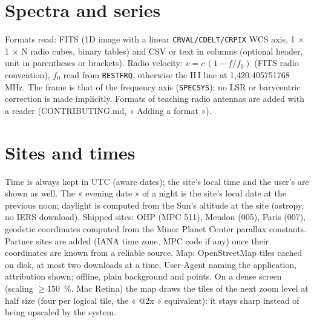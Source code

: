 \section{Spectra and series}
Formats read: FITS (1D image with a linear \texttt{CRVAL/CDELT/CRPIX} WCS axis, 1 × 1 × N radio cubes, binary
tables) and CSV or text in columns (optional header, unit in parentheses or brackets). Radio velocity:
$v = c\,(1 - f/f_0)$ (FITS radio convention), $f_0$ read from \texttt{RESTFRQ}, otherwise the H\,I line at
1,420.405751768 MHz. The frame is that of the frequency axis (\texttt{SPECSYS}); no LSR or barycentric correction is
made implicitly. Formats of teaching radio antennas are added with a reader (CONTRIBUTING.md, « Adding a format »).

\section{Sites and times}
Time is always kept in UTC (aware dates); the site's local time and the user's are shown as well. The « evening
date » of a night is the site's local date at the previous noon; daylight is computed from the Sun's altitude at the
site (astropy, no IERS download). Shipped sites: OHP (MPC 511), Meudon (005), Paris (007), geodetic coordinates
computed from the Minor Planet Center parallax constants. Partner sites are added (IANA time zone, MPC code if any)
once their coordinates are known from a reliable source. Map: OpenStreetMap tiles cached on disk, at most two
downloads at a time, User-Agent naming the application, attribution shown; offline, plain background and points. On
a dense screen (scaling $\geq 150$~\%, Mac Retina) the map draws the tiles of the next zoom level at half size (four
per logical tile, the « @2x » equivalent): it stays sharp instead of being upscaled by the system.

